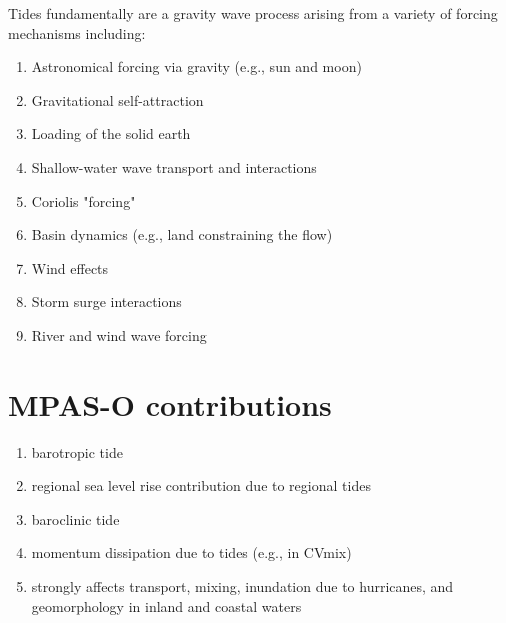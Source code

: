 Tides fundamentally are a gravity wave process arising from a variety of forcing mechanisms including:
\begin{enumerate}
\item Astronomical forcing via gravity (e.g., sun and moon)
\item Gravitational self-attraction
\item Loading of the solid earth
\item Shallow-water wave transport and interactions
\item Coriolis "forcing"
\item Basin dynamics (e.g., land constraining the flow)
\item Wind effects
\item Storm surge interactions
\item River and wind wave forcing
\end{enumerate}

\section{MPAS-O contributions}
\begin{enumerate}
\item barotropic tide
\item regional sea level rise contribution due to regional tides
\item baroclinic tide
\item momentum dissipation due to tides (e.g., in CVmix)
\item strongly affects transport, mixing, inundation due to hurricanes, and geomorphology in inland and coastal waters
\end{enumerate}

